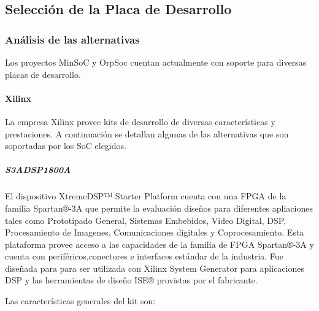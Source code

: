  			\subsection{Selección de la Placa de Desarrollo}
 				\subsubsection{Análisis de las alternativas} 
				Los proyectos MinSoC y OrpSoc cuentan actualmente con soporte para diversas placas de desarrollo. 
				\paragraph{Xilinx}
				La empresa Xilinx provee kits de desarrollo de diversas características y prestaciones. A continuación se detallan algunas de las alternativas que
				son soportadas por los SoC elegidos.
				\subparagraph{S3ADSP1800A}
				El dispositivo XtremeDSP™ Starter Platform cuenta con una FPGA de la familia Spartan®-3A que permite la evaluación diseños para diferentes
				apliaciones tales como Prototipado General, Sistemas Embebidos, Video Digital, DSP, Procesamiento de Imagenes, Comunicaciones digitales y
				Coprocesamiento. Esta plataforma provee acceso a las capacidades de la familia de FPGA Spartan®-3A y cuenta con periféricos,conectores e
				interfaces estándar de la industria. Fue diseñada para para ser utilizada con Xilinx System Generator para aplicaciones DSP y las herramientas de
				diseño ISE® provistas por el fabricante. 
				
				Las características generales del kit son:
				
